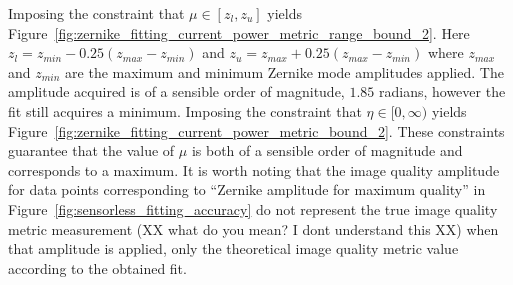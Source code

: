 Imposing the constraint that $\mu \in [z_{l}, z_{u}]$ yields 
Figure~\ref{fig:zernike_fitting_current_power_metric_range_bound_2}. Here 
$z_{l} = z_{min} - 0.25(z_{max}-z_{min})$ and $z_{u} = z_{max} + 
0.25(z_{max}-z_{min})$ where $z_{max}$ and $z_{min}$ are the maximum and 
minimum Zernike mode amplitudes applied. The amplitude acquired is of a 
sensible order of magnitude, $1.85$ radians, however the fit still acquires 
a minimum. Imposing the constraint that $\eta \in [0, \infty)$ 
yields Figure~\ref{fig:zernike_fitting_current_power_metric_bound_2}. These 
constraints guarantee that the value of $\mu$ is both of a sensible 
order of magnitude and corresponds to a maximum. It is worth noting that 
the image quality amplitude for data points corresponding to ``Zernike 
amplitude for maximum quality'' in 
Figure~\ref{fig:sensorless_fitting_accuracy} do not represent the true 
image quality metric measurement (XX what do you mean? I dont
understand this XX)  when that amplitude is applied, only the 
theoretical image quality metric value according to the obtained fit. 

